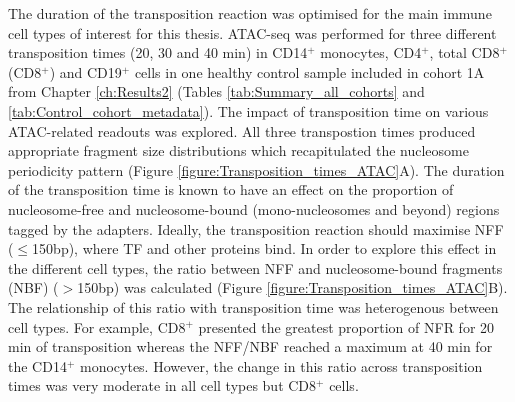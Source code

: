 The duration of the transposition reaction was optimised for the main immune cell types of interest for this thesis. ATAC-seq was performed for three different transposition times (20, 30 and 40 min) in CD14$^+$ monocytes, CD4$^+$, total CD8$^+$ (CD8$^+$) and CD19$^+$ cells in one healthy control sample included in cohort 1A from Chapter \ref{ch:Results2} (Tables \ref{tab:Summary_all_cohorts} and \ref{tab:Control_cohort_metadata}). The impact of transposition time on various ATAC-related readouts was explored. All three transpostion times produced appropriate fragment size distributions which recapitulated the nucleosome periodicity pattern (Figure \ref{figure:Transposition_times_ATAC}A). The duration of the transposition time is known to have an effect on the proportion of nucleosome-free and nucleosome-bound (mono-nucleosomes and beyond) regions tagged by the adapters. Ideally, the transposition reaction should maximise NFF ($\leq$150bp), where TF and other proteins bind. In order to explore this effect in the different cell types, the ratio between NFF and nucleosome-bound fragments (NBF) ($>$150bp) was calculated (Figure \ref{figure:Transposition_times_ATAC}B). The relationship of this ratio with transposition time was heterogenous between cell types. For example, CD8$^+$ presented the greatest proportion of NFR for 20 min of transposition whereas the NFF/NBF reached a maximum at 40 min for the CD14$^+$ monocytes. However, the change in this ratio across transposition times was very moderate in all cell types but CD8$^+$ cells. 


